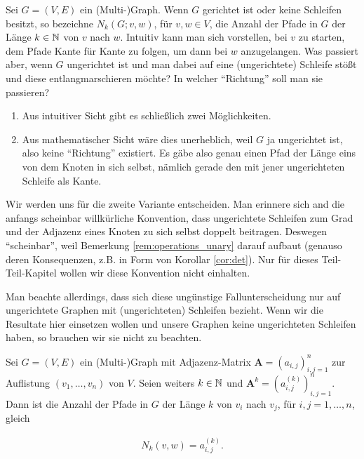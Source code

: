             Sei $G = (V, E)$ ein (Multi-)Graph.
            Wenn $G$ gerichtet ist oder keine Schleifen besitzt, so bezeichne $N_k(G; v, w)$, für $v, w \in V$, die Anzahl der Pfade in $G$ der Länge $k \in \mathbb N$ von $v$ nach $w$.
            Intuitiv kann man sich vorstellen, bei $v$ zu starten, dem Pfade Kante für Kante zu folgen, um dann bei $w$ anzugelangen.
            Was passiert aber, wenn $G$ ungerichtet ist und man dabei auf eine (ungerichtete) Schleife stößt und diese entlangmarschieren möchte?
            In welcher \enquote{Richtung} soll man sie passieren?

            \begin{enumerate}[label = \arabic*.]

                \item Aus intuitiver Sicht gibt es schließlich zwei Möglichkeiten.

                \item Aus mathematischer Sicht wäre dies unerheblich, weil $G$ ja ungerichtet ist, also keine \enquote{Richtung} existiert.
                Es gäbe also genau einen Pfad der Länge eins von dem Knoten in sich selbst, nämlich gerade den mit jener ungerichteten Schleife als Kante.

            \end{enumerate}

            Wir werden uns für die zweite Variante entscheiden.
            Man erinnere sich and die anfangs scheinbar willkürliche Konvention, dass ungerichtete Schleifen zum Grad und der Adjazenz eines Knoten zu sich selbst doppelt beitragen.
            Deswegen \enquote{scheinbar}, weil Bemerkung \ref{rem:operations_unary} darauf aufbaut (genauso deren Konsequenzen, z.B. in Form von Korollar \ref{cor:det}).
            Nur für dieses Teil-Teil-Kapitel wollen wir diese Konvention nicht einhalten.

            Man beachte allerdings, dass sich diese ungünstige Fallunterscheidung nur auf ungerichtete Graphen mit (ungerichteten) Schleifen bezieht.
            Wenn wir die Resultate hier einsetzen wollen und unsere Graphen keine ungerichteten Schleifen haben, so brauchen wir sie nicht zu beachten.

            \begin{theorem} \label{thm:number_of_paths}

                Sei $G = (V, E)$ ein (Multi-)Graph mit Adjazenz-Matrix $\mathbf A = (a_{i,j})_{i,j=1}^n$ zur Auflistung $(v_1, \dots, v_n)$ von $V$.
                Seien weiters $k \in \mathbb N$ und $\mathbf A^k = (a_{i,j}^{(k)})_{i,j=1}^n$.
                Dann ist die Anzahl der Pfade in $G$ der Länge $k$ von $v_i$ nach $v_j$, für $i, j = 1, \dots, n$, gleich

                \begin{align*}
                    N_k(v, w) = a_{i,j}^{(k)}.
                \end{align*}

            \end{theorem}

